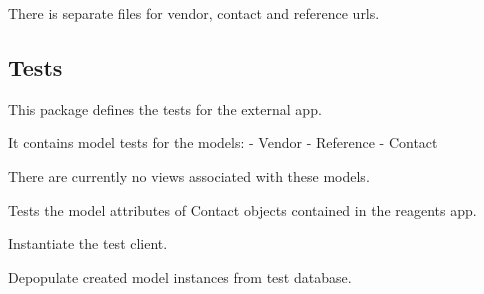 \documentclass[letterpaper,10pt,english]{sphinxmanual}
\begin{document}
There is separate files for vendor, contact and reference urls.



\subsection{Tests}
\label{api:id14}\label{api:module-experimentdb.external.tests}
This package defines the tests for the external app.


It contains model tests for the models:
- Vendor
- Reference
- Contact


There are currently no views associated with these models.


\begin{fulllineitems}
\label{api:experimentdb.external.tests.ContactModelTests}
Tests the model attributes of Contact objects contained in the reagents app.


\begin{fulllineitems}
\label{api:experimentdb.external.tests.ContactModelTests.setUp}
Instantiate the test client.


\end{fulllineitems}


\begin{fulllineitems}
\label{api:experimentdb.external.tests.ContactModelTests.tearDown}
Depopulate created model instances from test database.


\end{fulllineitems}


\begin{fulllineitems}
\label{api:experimentdb.external.tests.ContactModelTests.test_contact_absolute_url}
\end{fulllineitems}


\end{fulllineitems}
\end{document}
